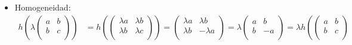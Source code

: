\documentclass[12pt]{article}
\begin{document}
\begin{ejercicio}[5,5 puntos]
\begin{enumerate}
\begin{itemize}
\begin{align*}
\begin{pmatrix}
					                                                                                                                     a' & b' \\
					                                                                                                                     b' & c' \\
				                                                                                                                     \end{pmatrix}\right)
			            \end{align*}
			      \item Homogeneidad:
			            \begin{align*}
				            h\left(\lambda \begin{pmatrix}
					                           a & b \\
					                           b & c \\
				                           \end{pmatrix}\right) & = h\left(\begin{pmatrix}
					                                                           \lambda a & \lambda b \\
					                                                           \lambda b & \lambda c \\
				                                                           \end{pmatrix}\right) = \begin{pmatrix}
					                                                                                  \lambda a & \lambda b  \\
					                                                                                  \lambda b & -\lambda a \\
				                                                                                  \end{pmatrix}
				            = \lambda \begin{pmatrix}
					                      a & b  \\
					                      b & -a \\
				                      \end{pmatrix} = \lambda h\left(\begin{pmatrix}
					                                                     a & b \\
					                                                     b & c \\

\end{pmatrix}
\end{align*}
\end{itemize}
\end{enumerate}
\end{ejercicio}
\end{document}
